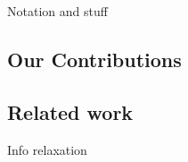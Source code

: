 Notation and stuff 

\subsection{Our Contributions}



\subsection{Related work}

Info relaxation \citep{info_relaxation,info_relaxation2}